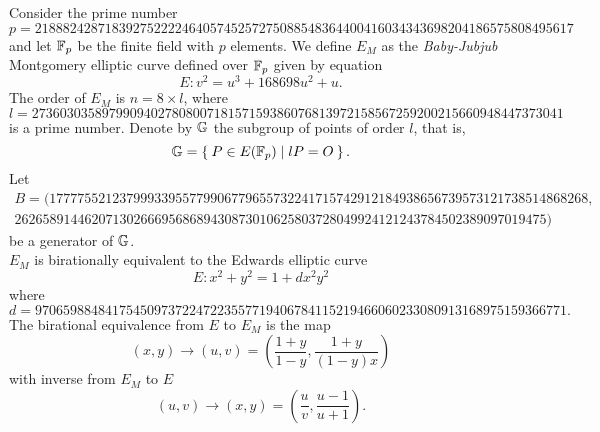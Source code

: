 Consider the prime number 
$$	p = 21888242871839275222246405745257275088548364
400416034343698204186575808495617 $$
and let $\mathbb{F}_p$ be the finite field with $p$ elements. 
%
%
We define $E_M$ as the {\it Baby-Jubjub} Montgomery elliptic curve defined over $\mathbb{F}_p$ given %
by equation
$$	E: v^2 = u^3 +  168698u^2 + u. $$
The order of $E_M$ is $n = 8\times l$, where 
$$	l = 2736030358979909402780800718157159386076813972
158567259200215660948447373041 $$ 
is a prime number. Denote by $\mathbb{G}$ the subgroup of points of order $l$, that is, %
$$\mathbb{G} = \Set{ P \in E(\ensuremath{\mathbb{F}_p}) | l P = O  }.$$
Let
\begin{align*} 
	B =  (17777552123799933955779906779655732241715742912184938656739573121738514868268,\\
2626589144620713026669568689430873010625803728049924121243784502389097019475)
\end{align*}
be a generator of $\mathbb{G}$.\\

$E_M$ is birationally equivalent to the Edwards elliptic curve %
$$	E: x^2 + y^2 = 1 +  d x^2 y^2 $$
where
$ d = 9706598848417545097372247223557719406784115219466060233080913168975159366771.$ \\


The birational equivalence \cite[Thm. 3.2]{twisted} from $E$ to $E_M$ is the map
$$ (x,y) \to (u,v) = \left( \frac{1 + y}{1 - y} , \frac{1 + y}{(1 - y)x} \right) $$
with inverse from $E_M$ to $E$
$$ (u, v) \to (x, y) = \left(  \frac{u}{v}, \frac{u - 1}{u + 1}   \right). $$
